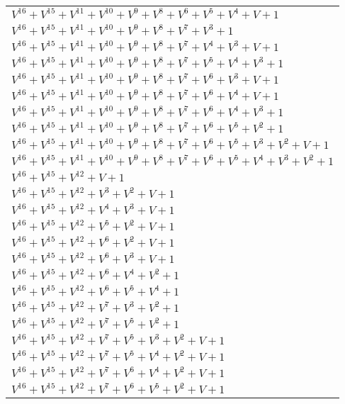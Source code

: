 \documentclass[12pt]{article}
\begin{document}
\begin{adjustwidth}{-4cm}{}
\begin{center}
\begin{longtable}{|l|}
$V^{16}  +V^{15}  +V^{11}  +V^{10}  +V^{9}  +V^{8}  +V^{6}  +V^{5}  +V^{4}  + V + 1$ \\
$V^{16}  +V^{15}  +V^{11}  +V^{10}  +V^{9}  +V^{8}  +V^{7}  +V^{3}  + 1$ \\
$V^{16}  +V^{15}  +V^{11}  +V^{10}  +V^{9}  +V^{8}  +V^{7}  +V^{4}  +V^{3}  + V + 1$ \\
$V^{16}  +V^{15}  +V^{11}  +V^{10}  +V^{9}  +V^{8}  +V^{7}  +V^{5}  +V^{4}  +V^{3}  + 1$ \\
$V^{16}  +V^{15}  +V^{11}  +V^{10}  +V^{9}  +V^{8}  +V^{7}  +V^{6}  +V^{3}  + V + 1$ \\
$V^{16}  +V^{15}  +V^{11}  +V^{10}  +V^{9}  +V^{8}  +V^{7}  +V^{6}  +V^{4}  + V + 1$ \\
$V^{16}  +V^{15}  +V^{11}  +V^{10}  +V^{9}  +V^{8}  +V^{7}  +V^{6}  +V^{4}  +V^{3}  + 1$ \\
$V^{16}  +V^{15}  +V^{11}  +V^{10}  +V^{9}  +V^{8}  +V^{7}  +V^{6}  +V^{5}  +V^{2}  + 1$ \\
$V^{16}  +V^{15}  +V^{11}  +V^{10}  +V^{9}  +V^{8}  +V^{7}  +V^{6}  +V^{5}  +V^{3}  +V^{2}  + V + 1$ \\
$V^{16}  +V^{15}  +V^{11}  +V^{10}  +V^{9}  +V^{8}  +V^{7}  +V^{6}  +V^{5}  +V^{4}  +V^{3}  +V^{2}  + 1$ \\
$V^{16}  +V^{15}  +V^{12}  + V + 1$ \\
$V^{16}  +V^{15}  +V^{12}  +V^{3}  +V^{2}  + V + 1$ \\
$V^{16}  +V^{15}  +V^{12}  +V^{4}  +V^{3}  + V + 1$ \\
$V^{16}  +V^{15}  +V^{12}  +V^{5}  +V^{2}  + V + 1$ \\
$V^{16}  +V^{15}  +V^{12}  +V^{6}  +V^{2}  + V + 1$ \\
$V^{16}  +V^{15}  +V^{12}  +V^{6}  +V^{3}  + V + 1$ \\
$V^{16}  +V^{15}  +V^{12}  +V^{6}  +V^{4}  +V^{2}  + 1$ \\
$V^{16}  +V^{15}  +V^{12}  +V^{6}  +V^{5}  +V^{4}  + 1$ \\
$V^{16}  +V^{15}  +V^{12}  +V^{7}  +V^{3}  +V^{2}  + 1$ \\
$V^{16}  +V^{15}  +V^{12}  +V^{7}  +V^{5}  +V^{2}  + 1$ \\
$V^{16}  +V^{15}  +V^{12}  +V^{7}  +V^{5}  +V^{3}  +V^{2}  + V + 1$ \\
$V^{16}  +V^{15}  +V^{12}  +V^{7}  +V^{5}  +V^{4}  +V^{2}  + V + 1$ \\
$V^{16}  +V^{15}  +V^{12}  +V^{7}  +V^{6}  +V^{4}  +V^{2}  + V + 1$ \\
$V^{16}  +V^{15}  +V^{12}  +V^{7}  +V^{6}  +V^{5}  +V^{2}  + V + 1$ \\

\end{longtable}
\end{center}
\end{adjustwidth}
\end{document}

